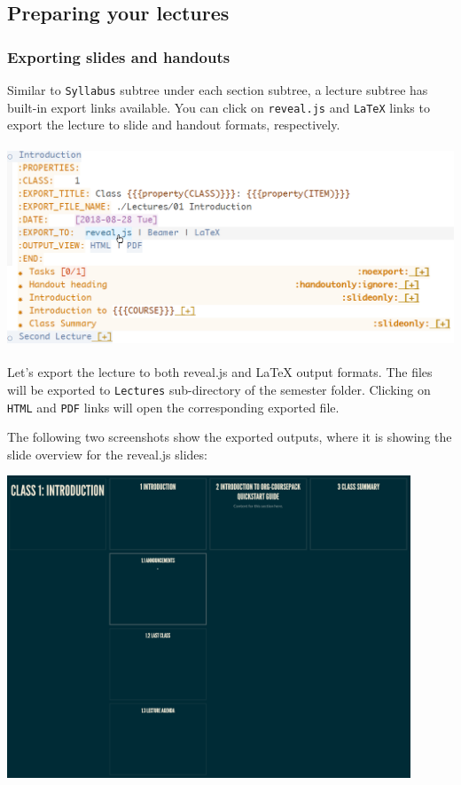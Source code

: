 \documentclass[10pt,article]{article}
\begin{document}
\subsection{Preparing your lectures}
\label{sec:org10f0594}
\subsubsection{Exporting slides and handouts}
\label{sec:orgaa96fb3}
Similar to \texttt{Syllabus} subtree under each section subtree, a lecture subtree
has built-in export links available. You can click on \texttt{reveal.js} and \texttt{LaTeX}
links to export the lecture to slide and handout formats, respectively.

\begin{center}
\includegraphics[height=6cm]{../../../Assets/Images/Org-Teaching/Quickstart_Lecture-Export-Link.png}
\end{center}

Let's export the lecture to both reveal.js and \LaTeX{} output formats. The files
will be exported to \texttt{Lectures} sub-directory of the semester folder. Clicking
on \texttt{HTML} and \texttt{PDF} links will open the corresponding exported file.

The following two screenshots show the exported outputs, where it is showing
the slide overview for the reveal.js slides:

\begin{center}
\includegraphics[height=9cm]{../../../Assets/Images/Org-Teaching/Quickstart_Lecture-Exported_reveal.png}
\end{center}
\end{document}
